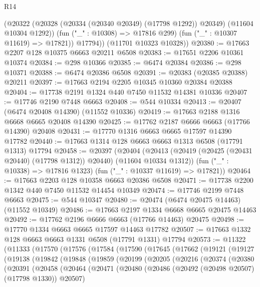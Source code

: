 \begin{lexlean}{R14}
\begin{coremodule}
{{{{{{{{{{{{{{{{{{{{{{{{{{{{{{{{{{{{{{{{{{{{{{{{{{{{{{{{{{{{{{{{{{{{{{{{{{{{{{{{{{            (@20322 (@20328 (@20334 (@20340 @20349) (@17798 @1292)) @20349) (@11604 @10304 @1292))
            (fun ("_" : @10308) => @17816 @299)
            (fun ("_" : @10307 @11619) => @17821))
          @17794))
      (@11701 @10323 @10328))
@20380 := @17663 @2207 @128 @10375 @6663 @20211 @6508
@20383 := @17651 @2206 @10361 @10374
@20384 := @298 @10366
@20385 := @6474 @20384
@20386 := @298 @10371
@20388 := @6474 @20386 @6508
@20391 := @20383 (@20385 @20388) @20211
@20397 := @17663 @2194 @2205 @10345 @10360 @20384 @20388
@20404 := @17738 @2191 @1324 @440 @7450 @11532 @14381 @10336
@20407 := @17746 @2190 @7448 @6663
@20408 := @544 @10334
@20413 := @20407 (@6474 @20408 @14390) (@11552 @10336)
@20419 := @17663 @2188 @1316 @6668 @6665 @20408 @14390
@20425 := @17762 @2187 @6666 @6663 (@17766 @14390) @20408
@20431 := @17770 @1316 @6663 @6665 @17597 @14390 @17782
@20440 := @17663 @1314 @128 @6663 @6663 @1313 @6508 (@17791 @1313) @17794
@20458 := @20397
    (@20404
      (@20413 (@20419 (@20425 (@20431 @20440) (@17798 @1312)) @20440) (@11604 @10334 @1312))
      (fun ("_" : @10338) => @17816 @1323)
      (fun ("_" : @10337 @11619) => @17821))
@20464 := @17663 @2203 @128 @10358 @6663 @20386 @6508
@20471 := @17738 @2200 @1342 @440 @7450 @11532 @14454 @10349
@20474 := @17746 @2199 @7448 @6663
@20475 := @544 @10347
@20480 := @20474 (@6474 @20475 @14463) (@11552 @10349)
@20486 := @17663 @2197 @1334 @6668 @6665 @20475 @14463
@20492 := @17762 @2196 @6666 @6663 (@17766 @14463) @20475
@20498 := @17770 @1334 @6663 @6665 @17597 @14463 @17782
@20507 := @17663 @1332 @128 @6663 @6663 @1331 @6508 (@17791 @1331) @17794
@20573 := @11322
    (@11333
      (@17570
        (@17576
          (@17584
            (@17590
              (@17645
                (@17662
                  (@19121
                    (@19127
                      (@19138
                        (@19842
                          (@19848
                            (@19859
                              (@20199
                                (@20205
                                  (@20216
                                    (@20374
                                      (@20380
                                        (@20391
                                          (@20458
                                            (@20464
                                              (@20471
                                                (@20480
                                                  (@20486
                                                    (@20492 (@20498 @20507) (@17798 @1330))
                                                    @20507)
}}}}}}}}}}}}}}}}}}}}}}}}}}}}}}}}}}}}}}}}}}}}}}}}}}}}}}}}}}}}}}}}}}}}}}}}}}}}}}}}}}
\end{coremodule}
\end{lexlean}
